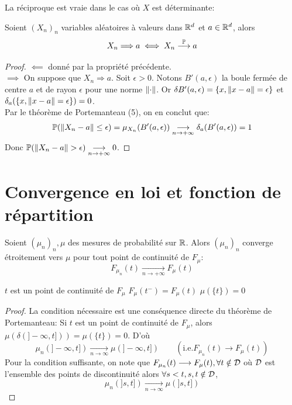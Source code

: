 \documentclass[]{report}
\begin{document}
    La réciproque est vraie dans le cas où $X$ est déterminante:

    \begin{lm}{}{}
        Soient $(X_n)_n$ variables aléatoires à valeurs dans $\mathbb{R}^d$ et $a\in \mathbb{R}^d$, alors 
        \[X_n\Longrightarrow a \iff X_n \overset{\mathbb{P}}{\longrightarrow} a\]
    \end{lm}

    \begin{proof}
        $\impliedby$ donné par la propriété précédente.\\
        $\implies$ On suppose que $X_n \Longrightarrow a$. Soit $\epsilon>0$. Notons $B'(a,\epsilon)$ la boule fermée de centre $a$ et de rayon $\epsilon$ pour une norme $\lVert \cdot \rVert$. Or $\delta B'(a,\epsilon)=\{x,\lVert x-a \rVert=\epsilon\}$ et $\delta_a(\{x,\lVert x-a \rVert=\epsilon\})=0$.\\
        Par le théorème de Portemanteau (5), on en conclut que:
        \[\mathbb{P}(\lVert X_n-a \rVert\le \epsilon)=\mu_{X_n}(B'(a,\epsilon))\underset{n\to+\infty}{\longrightarrow}\delta_a(B'(a,\epsilon))=1\]
        Donc $\mathbb{P}(\lVert X_n-a \rVert>\epsilon)\underset{n\to +\infty}{\longrightarrow} 0$.
    \end{proof}

    \section{Convergence en loi et fonction de répartition}

    \begin{tm}{}{}
        Soient $(\mu_n)_n,\mu$ des mesures de probabilité sur $\mathbb{R}$. Alors $(\mu_n)_n$ converge étroitement vers $\mu$ \ssi pour tout point de continuité de $F_\mu$:
        \[F_{\mu_n}(t)\underset{n\to +\infty}{\longrightarrow}F_{\mu}(t)\]
    \end{tm}

    \begin{re}{}{}
        $t$ est un point de continuité de $F_\mu$ \ssi $F_\mu(t^-)=F_\mu(t)$ \ssi $\mu(\{t\})=0$
    \end{re}

    \begin{proof}
        La condition nécessaire est une conséquence directe du théorème de Portemanteau: Si $t$ est un point de continuité de $F_\mu$, alors $\mu(\delta(]-\infty,t]))=\mu(\{t\})=0$. D'où
        \[\mu_n(]-\infty,t])\underset{n\to \infty}{\longrightarrow}\mu(]-\infty,t])\qquad (\text{i.e.}F_{\mu_n}(t)\to F_{\mu}(t))\]
        Pour la condition suffisante, on note que $F_{\mu_n}(t)\longrightarrow F_\mu(t),\forall t\notin \mathcal{D}$ où $\mathcal{D}$ est l'ensemble des points de discontinuité alors $\forall s<t,s,t\notin \mathcal{D}$,
        \[\mu_n(]s,t])\underset{n\to \infty}{\longrightarrow}\mu(]s,t])\]
    \end{proof}
\end{document}

